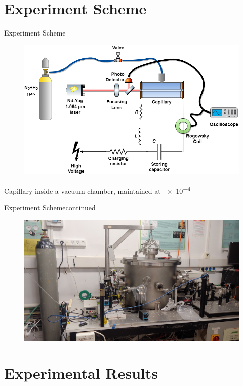 \documentclass[dvipsnames]{beamer}
\begin{document}
\section{Experiment Scheme}
\begin{frame}{Experiment Scheme}
\begin{figure}
 \includegraphics[width=\textwidth]{figures/methods/Laser-based ignition scheme.png}
\end{figure}
Capillary inside a vacuum chamber, maintained at \SI{e-4}{\torr}
\end{frame}
\begin{frame}{Experiment Scheme}{continued}
\begin{figure}
 \includegraphics[width=\textwidth]{figures/methods/system_picture.jpg}
\end{figure}
\end{frame}
\section{Experimental Results}
\end{document}
